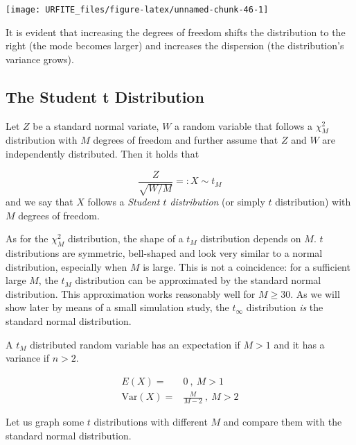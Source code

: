 \documentclass[]{book}
\theoremstyle{definition}
\theoremstyle{definition}
\theoremstyle{definition}
\theoremstyle{remark}
\begin{document}
\begin{center}\texttt{[image: URFITE\_files/figure-latex/unnamed-chunk-46-1]} \end{center}

It is evident that increasing the degrees of freedom shifts the
distribution to the right (the mode becomes larger) and increases the
dispersion (the distribution's variance grows).

\subsection*{The Student t Distribution}\label{thetdist}

Let \(Z\) be a standard normal variate, \(W\) a random variable that
follows a \(\chi^2_M\) distribution with \(M\) degrees of freedom and
further assume that \(Z\) and \(W\) are independently distributed. Then
it holds that

\[ \frac{Z}{\sqrt{W/M}} =:X \sim t_M \] and we say that \(X\) follows a
\emph{Student \(t\) distribution} (or simply \(t\) distribution) with
\(M\) degrees of freedom.

As for the \(\chi^2_M\) distribution, the shape of a \(t_M\)
distribution depends on \(M\). \(t\) distributions are symmetric,
bell-shaped and look very similar to a normal distribution, especially
when \(M\) is large. This is not a coincidence: for a sufficient large
\(M\), the \(t_M\) distribution can be approximated by the standard
normal distribution. This approximation works reasonably well for
\(M\geq 30\). As we will show later by means of a small simulation
study, the \(t_{\infty}\) distribution \emph{is} the standard normal
distribution.

A \(t_M\) distributed random variable has an expectation if \(M>1\) and
it has a variance if \(n>2\).

\begin{align}
  E(X) =& 0 \ , \ M>1 \\
  \text{Var}(X) =& \frac{M}{M-2} \ , \ M>2
\end{align}

Let us graph some \(t\) distributions with different \(M\) and compare
them with the standard normal distribution.
\end{document}
